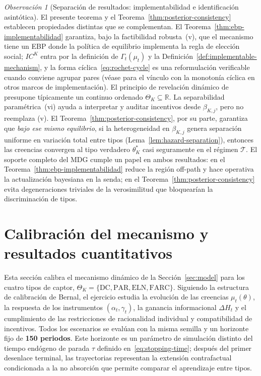 \documentclass[12pt]{article}
\providecommand{\textcite}{\citet}
\theoremstyle{definition}
\theoremstyle{remark}
\newtheorem{remark}[theorem]{Observación}
\newcommand{\1}{\mathbf{1}}
\begin{document}
\begin{remark}[Separación de resultados: implementabilidad e identificación asintótica]
El presente teorema y el Teorema~\ref{thm:posterior-consistency} establecen propiedades distintas que se complementan. El Teorema~\ref{thm:ebp-implementabilidad} garantiza, bajo la factibilidad robusta~\textup{(v)}, que el mecanismo tiene un EBP donde la política de equilibrio implementa la regla de elección social; $IC^K$ entra por la definición de $\Gamma_t(\mu_t)$ y la Definición~\ref{def:implementable-mechanism}, y la forma cíclica~\eqref{eq:rochet-cycle} es una reformulación verificable cuando conviene agrupar pares \textup{(}véase \textcite{Rochet1987,RochetChone1998} para el vínculo con la monotonía cíclica en otros marcos de implementación\textup{)}. El principio de revelación dinámico de \textcite{PavanSegalToikka2014} presupone típicamente un continuo ordenado $\Theta_K\subseteq\mathbb{R}$. La separabilidad paramétrica~\textup{(vi)} ayuda a interpretar y auditar incentivos desde $\beta_{K,j}$, pero no reemplaza \textup{(v)}. El Teorema~\ref{thm:posterior-consistency}, por su parte, garantiza que \emph{bajo ese mismo equilibrio}, si la heterogeneidad en $\beta_{K,j}$ genera separación uniforme en variación total entre tipos (Lema~\ref{lem:hazard-separation}), entonces las creencias convergen al tipo verdadero $\theta_K^\ast$ casi seguramente en el régimen $\mathcal{T}$. El soporte completo del MDG cumple un papel en ambos resultados: en el Teorema~\ref{thm:ebp-implementabilidad} reduce la región off-path y hace operativa la actualización bayesiana en la senda; en el Teorema~\ref{thm:posterior-consistency} evita degeneraciones triviales de la verosimilitud que bloquearían la discriminación de tipos.
\end{remark}

\section{Calibración del mecanismo y resultados cuantitativos}
\label{sec:calibracion}

Esta sección calibra el mecanismo dinámico de la Sección~\ref{sec:model} para los cuatro tipos de captor, $\Theta_K=\{\mathrm{DC},\mathrm{PAR},\mathrm{ELN},\mathrm{FARC}\}$. Siguiendo la estructura de calibración de Bernal, el ejercicio estudia la evolución de las creencias $\mu_t(\theta)$, la respuesta de los instrumentos $(\alpha_t,\gamma_t)$, la ganancia informacional $\Delta H_t$ y el cumplimiento de las restricciones de racionalidad individual y compatibilidad de incentivos. Todos los escenarios se evalúan con la misma semilla y un horizonte fijo de \textbf{150 periodos}. Este horizonte es un parámetro de simulación distinto del tiempo endógeno de parada $\tau$ definido en~\eqref{eq:stopping-time}; después del primer desenlace terminal, las trayectorias representan la extensión contrafactual condicionada a la no absorción que permite comparar el aprendizaje entre tipos.
\end{document}

